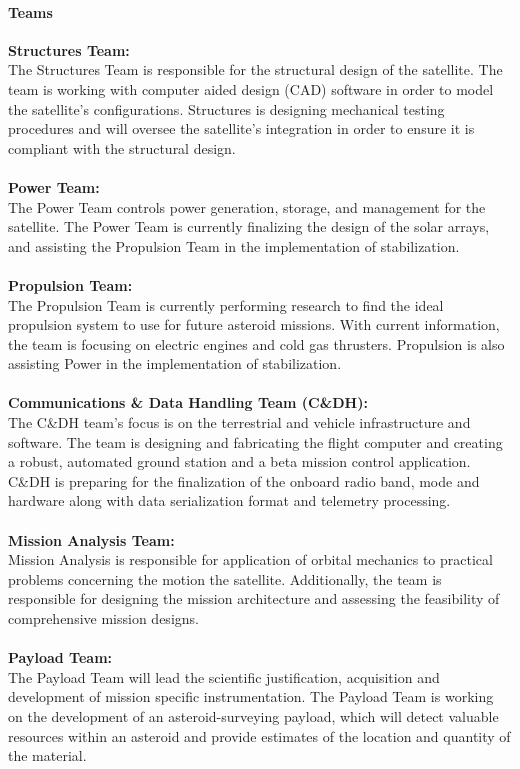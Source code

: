 \documentclass[nocover]            %
{CSLI}                       %
\begin{document}
\paragraph{Teams}
\textbf{Structures Team:}\\
The Structures Team is responsible for the structural design of the satellite. The team is working with computer aided design (CAD) software in order to model the satellite's configurations. Structures is designing mechanical testing procedures and will oversee the satellite's integration in order to  ensure it is compliant with the structural design.\\\\
\textbf{Power Team:}\\
The Power Team controls power generation, storage, and management for the satellite. The Power Team is currently finalizing the design of the solar arrays, and assisting the Propulsion Team in the implementation of stabilization.\\\\ 
\textbf{Propulsion Team:}\\
The Propulsion Team is currently performing research to find the ideal propulsion system to use for future asteroid missions. With current information, the team is focusing on electric engines and cold gas thrusters. Propulsion is also assisting Power in the implementation of stabilization.\\\\
\textbf{Communications \& Data Handling Team (C\&DH):}\\
The C\&DH team's focus is on the terrestrial and vehicle infrastructure and software. The team is designing and fabricating the flight computer and creating a robust, automated ground station and a beta mission control application. C\&DH is preparing for the finalization of the onboard radio band, mode and hardware along with data serialization format and telemetry processing.\\\\
\textbf{Mission Analysis Team:}\\
Mission Analysis is responsible for application of orbital mechanics to practical problems concerning the motion the satellite. Additionally, the team is responsible for designing the mission architecture and assessing the feasibility of comprehensive mission designs.\\\\
\textbf{Payload Team:}\\
The Payload Team will lead the scientific justification, acquisition and development of mission specific instrumentation. The Payload Team is working on the development of an asteroid-surveying payload, which will detect valuable resources within an asteroid and provide estimates of the location and quantity of the material.
\end{document}
